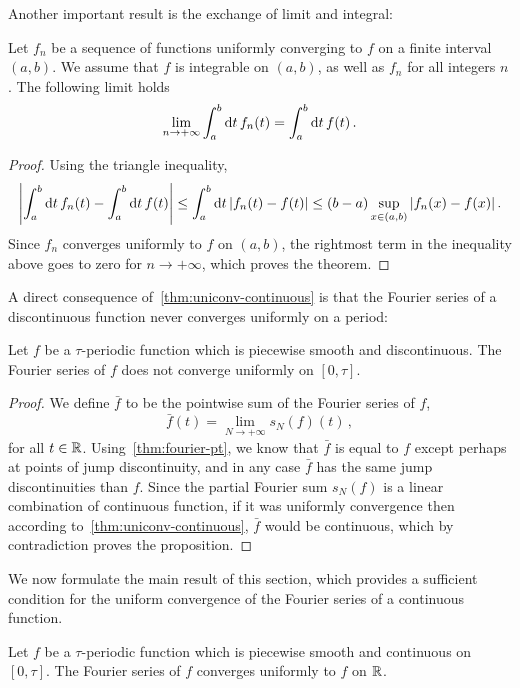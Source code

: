 Another important result is the exchange of limit and integral:
\begin{theorem}
  Let $f_n$ be a sequence of functions uniformly converging to $f$ on a finite interval
  $(a,b)$. We assume that $f$ is integrable on $(a,b)$, as well as $f_n$ for all integers
  $n$. The following limit holds
  \begin{equation}
    \lim_{n\to+\infty}\int_a^b\mathrm{d} t\,f_n(t)=\int_a^b\mathrm{d} t\,f(t)\,.
  \end{equation}
\end{theorem}
\begin{proof}
  Using the triangle inequality,
  \begin{equation}
    \left|\int_a^b\mathrm{d} t\,f_n(t)-\int_a^b\mathrm{d} t\,f(t)\right|
    \leq\int_a^b\mathrm{d} t\,|f_n(t)-f(t)|\leq (b-a)\sup_{x\in (a,b)}|f_n(x)-f(x)|\,.
  \end{equation}
  Since $f_n$ converges uniformly to $f$ on $(a,b)$, the rightmost term in the inequality
  above goes to zero for $n\to+\infty$, which proves the theorem.
\end{proof}
A direct consequence of~\cref{thm:uniconv-continuous} is that the Fourier series of a
discontinuous function never converges uniformly on a period:
\begin{proposition}
  Let $f$ be a $\tau$-periodic function which is piecewise smooth and discontinuous. The
  Fourier series of $f$ does not converge uniformly on $[0,\tau]$.
\end{proposition}
\begin{proof}
  We define $\bar{f}$ to be the pointwise sum of the Fourier series of $f$, \ie
  \begin{equation}
    \bar{f}(t)=\lim_{N\to+\infty}s_N(f)(t)\,,
  \end{equation}
  for all $t\in\mathbb{R}$. Using~\cref{thm:fourier-pt}, we know that $\bar{f}$ is equal
  to $f$ except perhaps at points of jump discontinuity, and in any case $\bar{f}$ has the
  same jump discontinuities than $f$. Since the partial Fourier sum $s_N(f)$ is a linear
  combination of continuous function, if it was uniformly convergence then according
  to~\cref{thm:uniconv-continuous}, $\bar{f}$ would be continuous, which by contradiction
  proves the proposition.
\end{proof}
We now formulate the main result of this section, which provides a sufficient condition
for the uniform convergence of the Fourier series of a continuous function.
\begin{theorem}
  \label{thm:fourier-uniconv}
  Let $f$ be a $\tau$-periodic function which is piecewise smooth and continuous on
  $[0,\tau]$. The Fourier series of $f$ converges uniformly to $f$ on $\mathbb{R}$.
\end{theorem}
